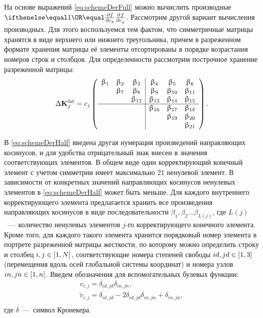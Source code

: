 На основе выражений \eqref{eq:schemeDerFull} можно вычислить производные $ \partDer{f}{c_p}{} $. Рассмотрим другой вариант вычисления производных. Для этого воспользуемся тем фактом, что симметричные матрицы хранятся в виде верхнего или нижнего треугольника, причем в разреженном формате хранения матрицы её элементы отсортированы в порядке возрастания номеров строк и столбцов. Для определенности рассмотрим построчное хранение разреженной матрицы:
\begin{equation}
	\Delta \mathbf{K} ^ {\text{int}}_j = c_j 
	\left(
	\begin{array}{c c c | c c c}
		\upbeta_1 & \upbeta_2 & \upbeta_3 & \upbeta_4 & \upbeta_5 & \upbeta_6 \\
		& \upbeta_7 & \upbeta_8 & \upbeta_9 & \upbeta_{10} & \upbeta_{11} \\
		& & \upbeta_{12} & \upbeta_{13} & \upbeta_{14} & \upbeta_{15} \\
		\hline
		& & & \upbeta_{16} & \upbeta_{17} & \upbeta_{18} \\
		& & & & \upbeta_{19} & \upbeta_{20}  \\
		& & & & & \upbeta_{21}
	\end{array}
	\right).
	\label{eq:schemeDerHalf}
\end{equation}

В \eqref{eq:schemeDerHalf} введена другая нумерация произведений направляющих косинусов, и для удобства отрицательный знак внесен в значения соответствующих элементов. В общем виде один корректирующий конечный элемент с учетом симметрии имеет максимально 21 ненулевой элемент. В зависимости от конкретных значений направляющих косинусов ненулевых элементов в \eqref{eq:schemeDerHalf} может быть меньше. Для каждого внутреннего корректирующего элемента предлагается хранить все произведения направляющих косинусов в виде последовательности $ \beta_1, \beta_2 \hdots \beta_{L(j)} $, где $ L(j) $~---~количество ненулевых элементов $ j $-го корректирующего конечного элемента. Кроме того, для каждого такого элемента хранится порядковый номер элемента в портрете разреженной матрицы жесткости, по которому можно определить строку и столбец $ i, j \in \left[ 1, N \right] $, соответствующие номера степеней свободы $ id, jd \in \left[ 1, 3 \right] $ (перемещения вдоль осей глобальной системы координат) и номера узлов $ in, jn \in \left[ 1, n \right] $. Введем обозначения для вспомогательных булевых функции:
\begin{equation}
	\begin{gathered}
		v_{i, j} = \delta_{id, jd} \delta_{in, jn}, \\
		\tilde{v}_{i, j} = \delta_{id, jd} - 2 \delta_{id, jd} \delta_{in, jn} + \delta_{in, jn}, \\
	\end{gathered}
\end{equation}
где $ \delta $~---~символ Кронекера.

